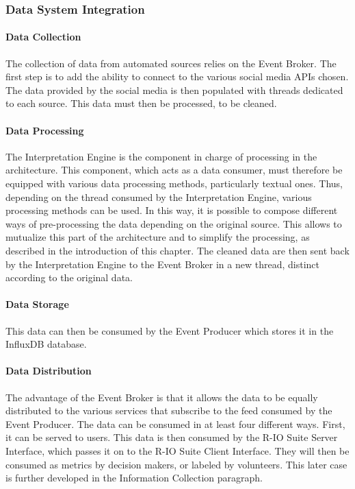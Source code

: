 \subsubsection{Data System Integration}
\paragraph{Data Collection}
The collection of data from automated sources relies on the Event Broker.
The first step is to add the ability to connect to the various social media APIs chosen.
The data provided by the social media is then populated with threads dedicated to each source.
This data must then be processed, to be cleaned.
\paragraph{Data Processing}
The Interpretation Engine is the component in charge of processing in the architecture.
This component, which acts as a data consumer, must therefore be equipped with various data processing methods, particularly textual ones.
Thus, depending on the thread consumed by the Interpretation Engine, various processing methods can be used.
In this way, it is possible to compose different ways of pre-processing the data depending on the original source.
This allows to mutualize this part of the architecture and to simplify the processing, as described in the introduction of this chapter.
The cleaned data are then sent back by the Interpretation Engine to the Event Broker in a new thread, distinct according to the original data.
\paragraph{Data Storage}
This data can then be consumed by the Event Producer which stores it in the InfluxDB database.
\paragraph{Data Distribution}
The advantage of the Event Broker is that it allows the data to be equally distributed to the various services that subscribe to the feed consumed by the Event Producer.
The data can be consumed in at least four different ways.
First, it can be served to users.
This data is then consumed by the R-IO Suite Server Interface, which passes it on to the R-IO Suite Client Interface.
They will then be consumed as metrics by decision makers, or labeled by volunteers.
This later case is further developed in the Information Collection paragraph.

